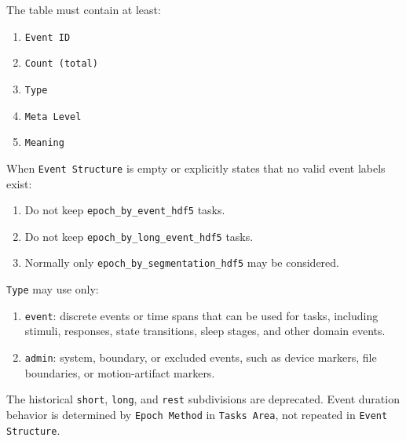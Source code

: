 \begin{tcolorbox}
\noindent The table must contain at least:\par\smallskip

\begin{enumerate}[leftmargin=1.5em,noitemsep,topsep=2pt]
\item \texttt{Event ID}
\item \texttt{Count (total)}
\item \texttt{Type}
\item \texttt{Meta Level}
\item \texttt{Meaning}
\end{enumerate}

\smallskip{}\par\smallskip

\noindent When \texttt{Event Structure} is empty or explicitly states that no valid event labels exist:\par\smallskip

\begin{enumerate}[leftmargin=1.5em,noitemsep,topsep=2pt]
\item Do not keep \texttt{epoch\_by\_event\_hdf5} tasks.
\item Do not keep \texttt{epoch\_by\_long\_event\_hdf5} tasks.
\item Normally only \texttt{epoch\_by\_segmentation\_hdf5} may be considered.
\end{enumerate}

\smallskip{}\par\smallskip

\noindent \texttt{Type} may use only:\par\smallskip

\begin{enumerate}[leftmargin=1.5em,noitemsep,topsep=2pt]
\item \texttt{event}: discrete events or time spans that can be used for tasks, including stimuli, responses, state transitions, sleep stages, and other domain events.
\item \texttt{admin}: system, boundary, or excluded events, such as device markers, file boundaries, or motion-artifact markers.
\end{enumerate}

\noindent The historical \texttt{short}, \texttt{long}, and \texttt{rest} subdivisions are deprecated. Event duration behavior is determined by \texttt{Epoch Method} in \texttt{Tasks Area}, not repeated in \texttt{Event Structure}.\par\smallskip


\end{tcolorbox}
